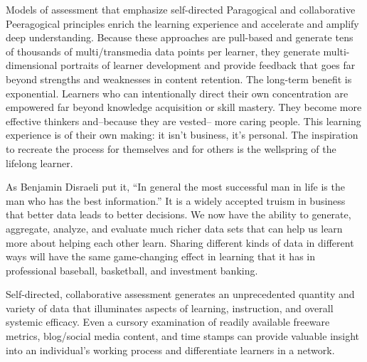 Models of assessment that emphasize self-directed Paragogical and
collaborative Peeragogical principles enrich the learning experience and
accelerate and amplify deep understanding. Because these approaches are
pull-based and generate tens of thousands of multi/transmedia data
points per learner, they generate multi-dimensional portraits of learner
development and provide feedback that goes far beyond strengths and
weaknesses in content retention. The long-term benefit is exponential.
Learners who can intentionally direct their own concentration are
empowered far beyond knowledge acquisition or skill mastery. They become
more effective thinkers and--because they are vested-- more caring
people. This learning experience is of their own making: it isn't
business, it's personal. The inspiration to recreate the process for
themselves and for others is the wellspring of the lifelong learner.

As Benjamin Disraeli put it, ``In general the most successful man in
life is the man who has the best information.'' It is a widely accepted
truism in business that better data leads to better decisions. We now
have the ability to generate, aggregate, analyze, and evaluate much
richer data sets that can help us learn more about helping each other
learn. Sharing different kinds of data in different ways will have the
same game-changing effect in learning that it has in professional
baseball, basketball, and investment banking.

Self-directed, collaborative assessment generates an unprecedented
quantity and variety of data that illuminates aspects of learning,
instruction, and overall systemic efficacy. Even a cursory examination
of readily available freeware metrics, blog/social media content, and
time stamps can provide valuable insight into an individual's working
process and differentiate learners in a network.





